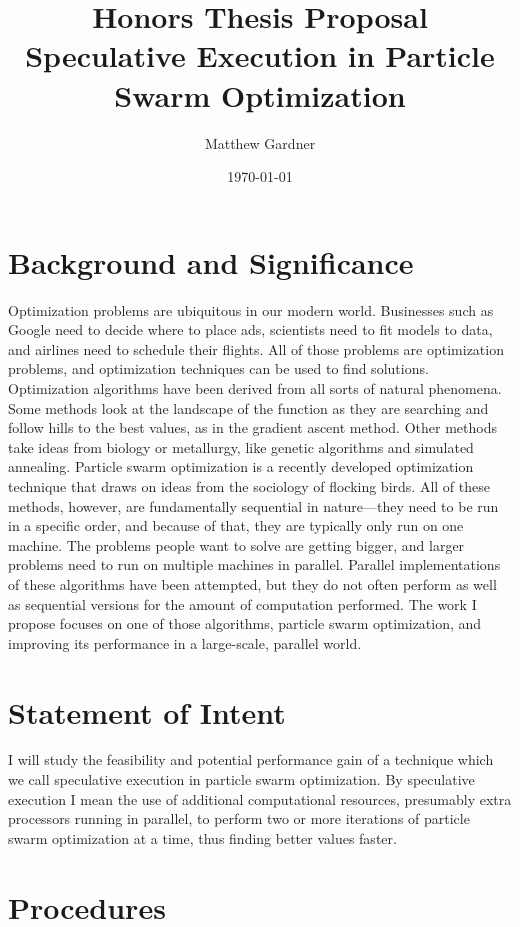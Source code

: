 \documentclass[onecolumn, 12pt]{article}
\title{Honors Thesis Proposal\\Speculative Execution in Particle Swarm
Optimization}
\author{Matthew Gardner}
\date{\today}
\begin{document}
\maketitle

\section{Background and Significance}

Optimization problems are ubiquitous in our modern world.  Businesses such as
Google need to decide where to place ads, scientists need to fit models to
data, and airlines need to schedule their flights.  All of those problems are
optimization problems, and optimization techniques can be used to find
solutions.  Optimization algorithms have been derived from all sorts of natural
phenomena.  Some methods look at the landscape of the function as they are
searching and follow hills to the best values, as in the gradient ascent
method.  Other methods take ideas from biology or metallurgy, like genetic
algorithms and simulated annealing.  Particle swarm optimization is a recently
developed optimization technique that draws on ideas from the sociology of
flocking birds.  All of these methods, however, are fundamentally sequential in
nature---they need to be run in a specific order, and because of that, they are
typically only run on one machine.  The problems people want to solve are
getting bigger, and larger problems need to run on multiple machines in
parallel.  Parallel implementations of these algorithms have been attempted,
but they do not often perform as well as sequential versions for the amount of
computation performed.  The work I propose focuses on one of those algorithms,
particle swarm optimization, and improving its performance in a large-scale,
parallel world.

\section{Statement of Intent}

I will study the feasibility and potential performance gain of a technique
which we call speculative execution in particle swarm optimization.  By
speculative execution I mean the use of additional computational resources,
presumably extra processors running in parallel, to perform two or more
iterations of particle swarm optimization at a time, thus finding better values
faster.

\section{Procedures}
\label{sec:proc}
\end{document}
